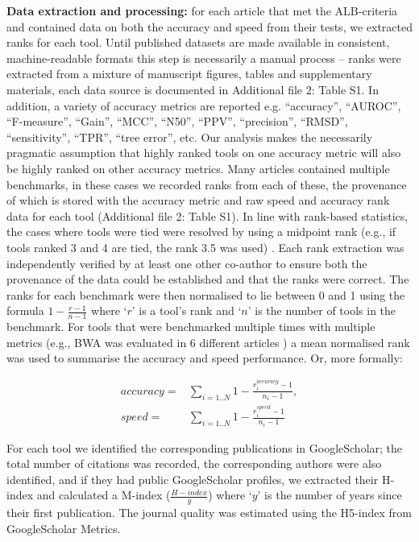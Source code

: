 \documentclass{bmcart}
\begin{document}
{\textbf{Data extraction and processing:} for each article that met the
ALB-criteria and contained data on both the accuracy and speed from
their tests, we extracted ranks for each tool. {\color{red}Until published datasets are made available in consistent, machine-readable formats this step is necessarily a manual process -- ranks were extracted from a mixture of manuscript figures, tables and supplementary materials, each data source is documented in {\color{red} Additional file 2:} Table S1. In addition, a variety of accuracy metrics are reported e.g. ``accuracy'', ``AUROC'', ``F-measure'', ``Gain'', ``MCC'', ``N50'', ``PPV'', ``precision'', ``RMSD'', ``sensitivity'', ``TPR'', ``tree error'', etc. Our analysis makes the necessarily pragmatic assumption that highly ranked tools on one accuracy metric will also be highly ranked on other accuracy metrics.}
Many articles contained
multiple benchmarks, in these cases we recorded ranks from each of these, the
provenance of which is stored with the accuracy metric and raw speed
and accuracy rank data for each tool {\color{red}(Additional file 2: Table S1)}. In line with rank-based
statistics, the cases where tools were tied were resolved by using a
midpoint rank (e.g., if tools ranked 3 and 4 are tied, the rank 3.5 was used)
\cite{Mann1947-re}. Each rank extraction was independently verified by
at least one other co-author to ensure both the provenance of the data
could be established and that the ranks were correct. The ranks for
each benchmark were then normalised to lie between 0 and 1 using the
formula $1-\frac{r-1}{n-1}$ where ‘$r$’ is a tool’s rank and ‘$n$’ is the
number of tools in the benchmark. For tools that were benchmarked
multiple times with multiple metrics (e.g., BWA was evaluated in 6
different articles
\cite{Bao2011-lv,Caboche2014-lj,Hatem2013-cs,Schbath2012-ob,Ruffalo2011-rl,Holtgrewe2011-fd})
a mean normalised rank was used to summarise the accuracy and speed performance. 
Or, more formally:
 
\begin{equation*}
\begin{split}
accuracy =& \sum_{i=1..N} 1-\frac{r^{accuracy}_i-1}{n_i-1}, \\
speed    =& \sum_{i=1..N} 1-\frac{r^{speed   }_i-1}{n_i-1}
\end{split}
\end{equation*}
 
For each tool we identified the corresponding publications in
GoogleScholar; the total number of citations was recorded, the
corresponding authors were also identified, and if they had public
GoogleScholar profiles, we extracted their H-index and calculated a
M-index ($\frac{H-index}{y}$) where ‘$y$’ is the number of years since
their first publication. The journal quality was estimated using the H5-index
from GoogleScholar Metrics. 

}
\end{document}
